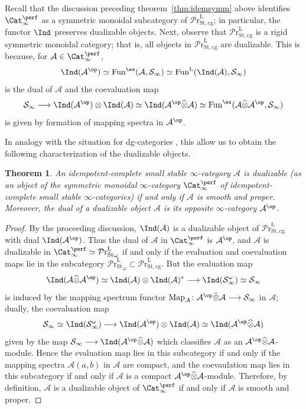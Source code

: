 \documentclass{amsart}
\renewcommand{\to}{\mathchoice{\longrightarrow}{\rightarrow}{\rightarrow}{\rightarrow}}
\let\catsymbfont\mathcal
\newcommand{\aA}{{\catsymbfont{A}}}
\newcommand{\aS}{{\catsymbfont{S}}}
\newcommand{\A}{\mathcal{A}}
\renewcommand{\L}{\mathrm{L}}
\newcommand{\idemstabcat}{\Cat_\i^{\perf}}
\newcommand{\idemtimes}{\widehat{\otimes}}
\newcommand{\stabprcat}{{{\mathcal{P}\mathrm{r}}^{\mathrm{L}}_\mathrm{St}}}
\newcommand{\stabprcatcg}{{{\mathcal{P}\mathrm{r}}^{\mathrm{L}}_\mathrm{St,cg}}}
\newcommand{\Fun}{\mathrm{Fun}} %
\newcommand{\Map}{\mathrm{Map}}%
\newcommand{\ispec}{\aS_{\infty}}
\newcommand{\too}{\longrightarrow}%
\renewcommand{\i}{\infty}
\numberwithin{equation}{section}
\newtheorem{theorem}[equation]{Theorem}
\theoremstyle{definition}
\begin{document}
Recall that the discussion preceding theorem~\ref{thm:idemsymm} above
identifies $\idemstabcat$ as a symmetric monoidal subcategory of
$\stabprcatcg$; in particular, the functor $\Ind$ preserves
dualizable objects.  Next, observe that $\stabprcatcg$
is a rigid symmetric monoidal category; that is, all objects in
$\stabprcatcg$ are dualizable.  This is because, for $\aA\in\idemstabcat$,
\[
\Ind(\aA^{\op})\simeq\Fun^{\ex}(\aA,\ispec)\simeq\Fun^\L(\Ind(\aA),\ispec)
\]
is the dual of $\aA$ and the coevaluation map
\[
\ispec\to\Ind(\aA^{\op})\otimes\Ind(\aA)\simeq\Ind(\aA^{\op}\idemtimes\aA)\simeq\Fun^{\ex}(\aA\idemtimes\aA^{\op},\ispec)
\]
is given by formation of mapping spectra in $\aA^{\op}$.

In analogy with the situation for dg-categories \cite[\S4]{CisTab},
this allow us to obtain the following characterization of the
dualizable objects.

\begin{theorem}\label{thm:dualizable}
An idempotent-complete small stable $\infty$-category $\aA$ is
dualizable (as an object of the symmetric monoidal $\infty$-category
$\idemstabcat$ of idempotent-complete small stable
$\infty$-categories) if and only if $\aA$ is smooth and proper.  Moreover, the dual of a dualizable object
$\aA$ is its opposite $\infty$-category $\aA^{\op}$.
\end{theorem}

\begin{proof}
By the proceeding discussion, $\Ind(\aA)$ is a dualizable object of $\stabprcatcg$ with dual $\Ind(\aA^{\op})$. Thus the dual of $\aA$ in $\idemstabcat$ is $\aA^{\op}$, and $\aA$ is dualizable in $\idemstabcat\simeq\stabprcat_\omega$ if and only if the evaluation and coevaluation maps lie in the subcategory $\stabprcat_\omega\subset\stabprcatcg$. But the evaluation map
\[
\Ind(\aA\idemtimes\aA^{\op})\simeq\Ind(\aA)\otimes\Ind(\aA)^*\longrightarrow\Ind(\ispec^\omega)\simeq\ispec
\]
is induced by the mapping spectrum functor $\Map_\aA \colon \aA^{\op}\idemtimes\aA\longrightarrow\ispec$ in $\aA$; dually, the coevaluation map 
\[
\ispec\simeq\Ind(\ispec^\omega)\longrightarrow\Ind(\aA^{\op})\otimes\Ind(\aA)\simeq\Ind(\aA^{\op}\idemtimes\aA)
\]
given by the map $\ispec\too\Ind(\aA^{\op}\idemtimes\aA)$ which classifies $\aA$ as an $\aA^{\op}\idemtimes\aA$-module.  Hence the evaluation map lies in this subcategory if and only if the mapping spectra $\aA(a,b)$
in $\A$ are compact, and the coevaulation map lies in this subcategory if and only if $\aA$ is a compact $\aA^{\op}\idemtimes\aA$-module.
Therefore, by definition, $\aA$ is a dualizable object of $\idemstabcat$ if and only if $\aA$ is smooth and proper.
\end{proof}
\end{document}
